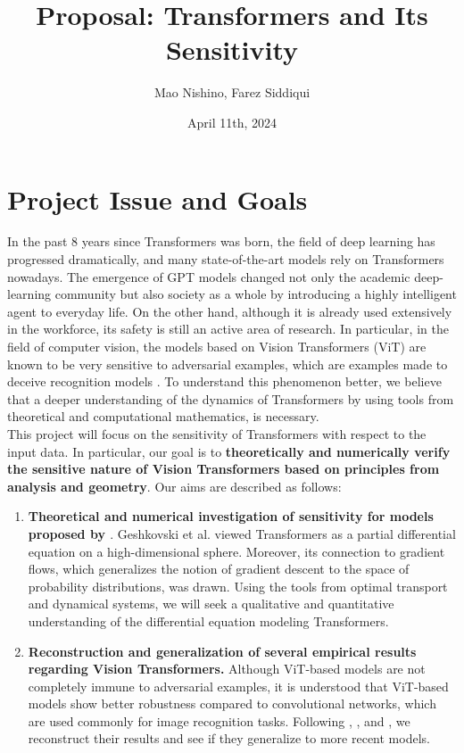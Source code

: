 \documentclass[
	12pt, %
]{../Template/fphw}
\title{Proposal: Transformers and Its Sensitivity} %
\author{Mao Nishino, Farez Siddiqui} %
\date{April 11th, 2024} %
\institute{Florida State University \\ Department of Computer Science} %
\begin{document}
\maketitle %

\section*{Project Issue and Goals} 
In the past 8 years since Transformers \cite{att} was born, the field of deep learning has progressed dramatically, and many state-of-the-art models rely on Transformers nowadays. The emergence of GPT models \cite{radford2018improving} changed not only the academic deep-learning community but also society as a whole by introducing a highly intelligent agent to everyday life. On the other hand, although it is already used extensively in the workforce, its safety is still an active area of research. In particular, in the field of computer vision, the models based on Vision Transformers (ViT) are known to be very sensitive to adversarial examples, which are examples made to deceive recognition models \cite{salman2024intriguing}. To understand this phenomenon better, we believe that a deeper understanding of the dynamics of Transformers by using tools from theoretical and computational mathematics, is necessary. \\

This project will focus on the sensitivity of Transformers with respect to the input data. In particular, our goal is to \textbf{theoretically and numerically verify the sensitive nature of Vision Transformers based on principles from analysis and geometry}. Our aims are described as follows:

\begin{enumerate}
    \item \textbf{Theoretical and numerical investigation of sensitivity for models proposed by \cite{geshkovski2024mathematical}}. Geshkovski et al. viewed Transformers as a partial differential equation on a high-dimensional sphere. Moreover, its connection to gradient flows, which generalizes the notion of gradient descent to the space of probability distributions, was drawn. Using the tools from optimal transport and dynamical systems, we will seek a qualitative and quantitative understanding of the differential equation modeling Transformers.
    \item \textbf{Reconstruction and generalization of several empirical results regarding Vision Transformers.} Although ViT-based models are not completely immune to adversarial examples, it is understood that ViT-based models show better robustness compared to convolutional networks, which are used commonly for image recognition tasks. Following \cite{naseer2021intriguing}, \cite{zhou2022understanding}, and \cite{salman2024intriguing}, we reconstruct their results and see if they generalize to more recent models. 

    
\end{enumerate}



\end{document}
